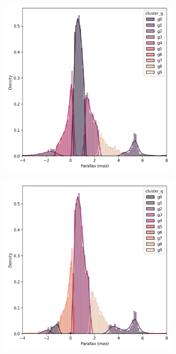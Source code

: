\documentclass[11pt,a4paper,english,twocolumn]{article}
\begin{document}
\begin{figure}[!hbt]
  \begin{subfigure}{0.3\textwidth}
    \includegraphics[width=\textwidth]{../figures/ngc_2632/kmeans_parallax_ngc_2632.png}
  \end{subfigure}
  \begin{subfigure}{0.3\textwidth}
    \includegraphics[width=\textwidth]{../figures/ngc_2632/dec_parallax_ngc_2632.png}

\end{subfigure}
\end{figure}
\end{document}
